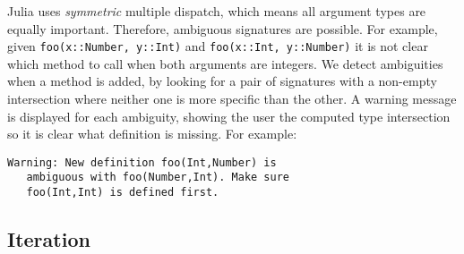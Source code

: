 \documentclass[9pt]{sigplanconf}
\begin{document}
Julia uses \emph{symmetric} multiple dispatch, which means all argument types
are equally important. Therefore, ambiguous signatures are possible.
For example, given {\tt foo(x::Number, y::Int)} and
{\tt foo(x::Int, y::Number)} it is not clear which method to call when both
arguments are integers. We detect ambiguities when a method is added, by
looking for a pair of signatures with a non-empty intersection where neither
one is more specific than the other. A warning message is displayed for each
ambiguity, showing the user the computed type intersection so it is clear what
definition is missing. For example:

\begin{verbatim}
Warning: New definition foo(Int,Number) is 
   ambiguous with foo(Number,Int). Make sure 
   foo(Int,Int) is defined first.
\end{verbatim}





\subsection{Iteration}
\end{document}

